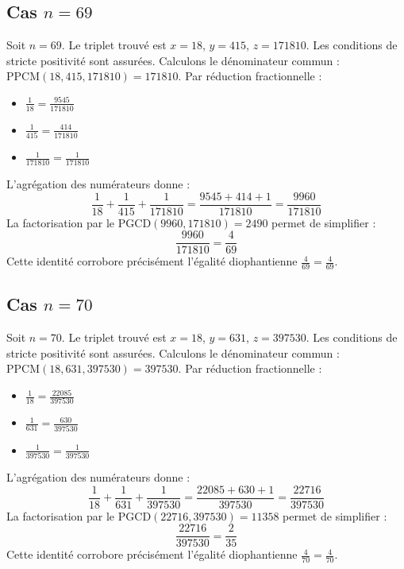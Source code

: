 \documentclass[11pt,a4paper]{article}
\begin{document}
\subsection{Cas $n = 69$}
Soit $n = 69$. Le triplet trouvé est $x = 18$, $y = 415$, $z = 171810$.
Les conditions de stricte positivité sont assurées.
Calculons le dénominateur commun : $\text{PPCM}(18, 415, 171810) = 171810$.
Par réduction fractionnelle :
\begin{itemize}
    \item $\frac{1}{18} = \frac{9545}{171810}$
    \item $\frac{1}{415} = \frac{414}{171810}$
    \item $\frac{1}{171810} = \frac{1}{171810}$
\end{itemize}
L'agrégation des numérateurs donne :
$$ \frac{1}{18} + \frac{1}{415} + \frac{1}{171810} = \frac{9545 + 414 + 1}{171810} = \frac{9960}{171810} $$
La factorisation par le $\text{PGCD}(9960, 171810) = 2490$ permet de simplifier :
$$ \frac{9960}{171810} = \frac{4}{69} $$
Cette identité corrobore précisément l'égalité diophantienne $\frac{4}{69} = \frac{4}{69}$.

\subsection{Cas $n = 70$}
Soit $n = 70$. Le triplet trouvé est $x = 18$, $y = 631$, $z = 397530$.
Les conditions de stricte positivité sont assurées.
Calculons le dénominateur commun : $\text{PPCM}(18, 631, 397530) = 397530$.
Par réduction fractionnelle :
\begin{itemize}
    \item $\frac{1}{18} = \frac{22085}{397530}$
    \item $\frac{1}{631} = \frac{630}{397530}$
    \item $\frac{1}{397530} = \frac{1}{397530}$
\end{itemize}
L'agrégation des numérateurs donne :
$$ \frac{1}{18} + \frac{1}{631} + \frac{1}{397530} = \frac{22085 + 630 + 1}{397530} = \frac{22716}{397530} $$
La factorisation par le $\text{PGCD}(22716, 397530) = 11358$ permet de simplifier :
$$ \frac{22716}{397530} = \frac{2}{35} $$
Cette identité corrobore précisément l'égalité diophantienne $\frac{4}{70} = \frac{4}{70}$.
\end{document}
